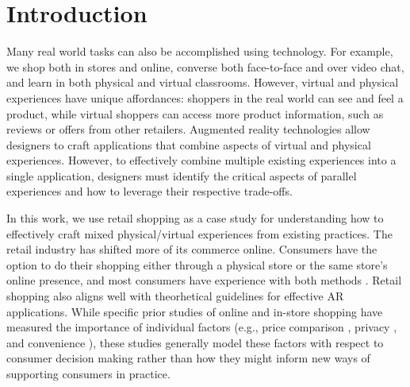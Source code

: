 \section{Introduction}

Many real world tasks can also be accomplished using technology. For example, we shop both in stores and online, converse both face-to-face and over video chat, and learn in both physical and virtual classrooms.  However, virtual and physical experiences have unique affordances: shoppers in the real world can see and feel a product, while virtual shoppers can access more product information, such as reviews or offers from other retailers. Augmented reality technologies allow designers to craft applications that combine aspects of virtual and physical experiences. However, to effectively combine multiple existing experiences into a single application, designers must identify the critical aspects of parallel experiences and how to leverage their respective trade-offs. 

In this work, we use retail shopping as a case study for understanding how to effectively craft mixed physical/virtual experiences from existing practices. The retail industry has shifted more of its commerce online.  Consumers have the option to do their shopping either through a physical store or the same store's online presence, and most consumers have experience with both methods \cite{}.  Retail shopping also aligns well with theorhetical guidelines for effective AR applications.  While specific prior studies of online and in-store shopping have measured the importance of individual factors (e.g., price comparison \cite{karlsson2005price}, privacy \cite{miyazaki2001consumer}, and convenience \cite{bednarz2010perceptions}), these studies generally model these factors with respect to consumer decision making rather than how they might inform new ways of supporting consumers in practice. 

